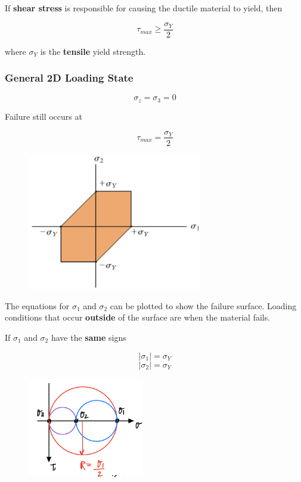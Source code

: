 \noindent If \textbf{shear stress} is responsible for causing the ductile material to yield, then 

\[\tau_{max} \ge \frac{\sigma_Y}{2}\]

\noindent where $\sigma_Y$ is the \textbf{tensile} yield strength.

\subsubsection{General 2D Loading State}

\[\sigma_z = \sigma_3 = 0\]

\noindent Failure still occurs at 

\[\tau_{max} = \frac{\sigma_Y}{2}\]

\begin{figure}[!h]
\centering
\includegraphics[angle=0, width=3in]{Failure Theories-Figures/TrescaSurface.png}
\vspace{-2mm}
\caption{\small {}}
\vspace{-3mm}
\label{Fig:TrescaSurface}
\end{figure}

\noindent The equations for $\sigma_1$ and $\sigma_2$ can be plotted to show the failure surface. Loading conditions that occur \textbf{outside} of the surface are when the material fails.

\noindent If $\sigma_1$ and $\sigma_2$ have the \textbf{same} signs

\[|\sigma_1| = \sigma_Y\]
\[|\sigma_2| = \sigma_Y\]

\begin{figure}[!h]
\centering
\includegraphics[angle=0, width=2in]{Failure Theories-Figures/TrescaSameSigns.png}
\vspace{-2mm}
\caption{\small {}}
\vspace{-3mm}
\label{Fig:TrescaSame}
\end{figure}

